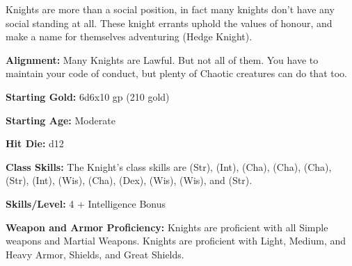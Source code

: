 
Knights are more than a social position, in fact many knights don't have any social standing at all. These knight errants uphold the values of honour, and make a name for themselves adventuring (Hedge Knight).

\textbf{Alignment:} Many Knights are Lawful. But not all of them. You have to maintain your code of conduct, but plenty of Chaotic creatures can do that too.

\textbf{Starting Gold:} 6d6x10 gp (210 gold)

\textbf{Starting Age:} Moderate

\textbf{Hit Die:} d12

\textbf{Class Skills:} The Knight's class skills are  (Str),  (Int),  (Cha),  (Cha),  (Cha),  (Str),  (Int),  (Wis),   (Cha),  (Dex),  (Wis),  (Wis), and  (Str).

\textbf{Skills/Level:} 4 + Intelligence Bonus

\goodbab{}
\poorfor{}
\poorref{}
\goodwil{}

\begin{classtable}
\end{classtable}

\classfeatures

\textbf{Weapon and Armor Proficiency:} Knights are proficient with all Simple weapons and Martial Weapons. Knights are proficient with Light, Medium, and Heavy Armor, Shields, and Great Shields.

